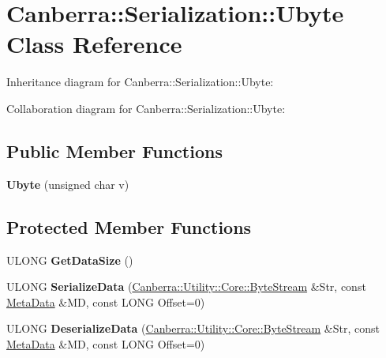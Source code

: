 \hypertarget{class_canberra_1_1_serialization_1_1_ubyte}{}\section{Canberra\+:\+:Serialization\+:\+:Ubyte Class Reference}
\label{class_canberra_1_1_serialization_1_1_ubyte}


Inheritance diagram for Canberra\+:\+:Serialization\+:\+:Ubyte\+:


Collaboration diagram for Canberra\+:\+:Serialization\+:\+:Ubyte\+:
\subsection*{Public Member Functions}
\begin{DoxyCompactItemize}
\item 
\mbox{\label{class_canberra_1_1_serialization_1_1_ubyte_a21abb887c844302d00c0bf6c5354dd01}} 
{\bfseries Ubyte} (unsigned char v)
\end{DoxyCompactItemize}
\subsection*{Protected Member Functions}
\begin{DoxyCompactItemize}
\item 
\mbox{\label{class_canberra_1_1_serialization_1_1_ubyte_a9bf2ada23193b70b97b6c8f57c964287}} 
U\+L\+O\+NG {\bfseries Get\+Data\+Size} ()
\item 
\mbox{\label{class_canberra_1_1_serialization_1_1_ubyte_a8fd248960272b864f60ff35dc0dfd70f}} 
U\+L\+O\+NG {\bfseries Serialize\+Data} (\hyperlink{class_canberra_1_1_utility_1_1_core_1_1_byte_stream}{Canberra\+::\+Utility\+::\+Core\+::\+Byte\+Stream} \&Str, const \hyperlink{class_canberra_1_1_serialization_1_1_meta_data}{Meta\+Data} \&MD, const L\+O\+NG Offset=0)
\item 
\mbox{\label{class_canberra_1_1_serialization_1_1_ubyte_a2dac73d273fafb37e086d477c729d909}} 
U\+L\+O\+NG {\bfseries Deserialize\+Data} (\hyperlink{class_canberra_1_1_utility_1_1_core_1_1_byte_stream}{Canberra\+::\+Utility\+::\+Core\+::\+Byte\+Stream} \&Str, const \hyperlink{class_canberra_1_1_serialization_1_1_meta_data}{Meta\+Data} \&MD, const L\+O\+NG Offset=0)
\end{DoxyCompactItemize}
